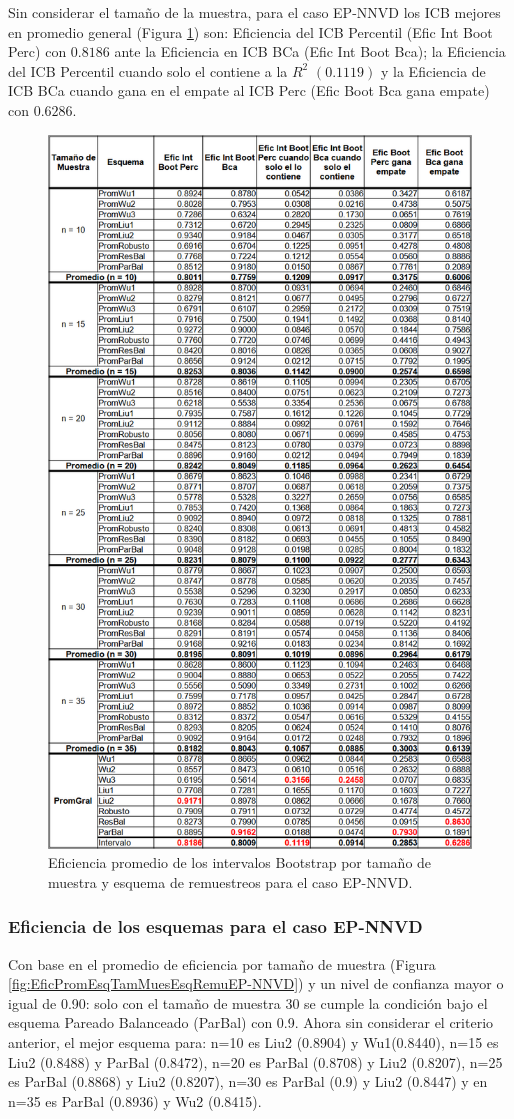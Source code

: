 Sin considerar el tamaño de la muestra, para el caso EP-NNVD los ICB mejores en promedio general  (Figura \ref{fig:EficPromIntBootsTamMuestEsqRemuEP-NNVD}) son: Eficiencia del ICB Percentil (Efic Int Boot Perc) con $0.8186$ ante la Eficiencia en ICB BCa (Efic Int Boot Bca); la Eficiencia del ICB Percentil cuando solo el contiene a la $R^{2}$ $(0.1119)$ y la Eficiencia de ICB BCa cuando gana en el empate al ICB Perc (Efic Boot Bca gana empate) con $0.6286$.


\begin{figure}[ht] 
	\centering 
	\includegraphics[width=0.55\linewidth]{img/EP_NNVD_Efic_Boots.png} 
	\caption{Eficiencia promedio de los intervalos Bootstrap por tamaño de muestra y esquema de remuestreos para el caso EP-NNVD.} 
	\label{fig:EficPromIntBootsTamMuestEsqRemuEP-NNVD}
\end{figure}
\FloatBarrier

\subsubsection{Eficiencia de los esquemas para el caso EP-NNVD}
Con base en el promedio de eficiencia por tamaño de muestra (Figura \ref{fig:EficPromEsqTamMuesEsqRemuEP-NNVD}) y un nivel de confianza mayor o igual de 0.90: solo con el tamaño de muestra 30 se cumple la condición bajo el esquema Pareado Balanceado (ParBal) con 0.9. Ahora sin considerar el criterio anterior, el mejor esquema para: n=10 es Liu2 (0.8904) y Wu1(0.8440), n=15 es Liu2 (0.8488) y ParBal (0.8472), n=20 es ParBal (0.8708) y Liu2 (0.8207), n=25 es ParBal (0.8868) y Liu2 (0.8207), n=30 es ParBal (0.9) y Liu2 (0.8447) y en n=35 es ParBal (0.8936) y Wu2 (0.8415). \\


